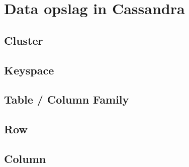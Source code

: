 \chapter{Data opslag in Cassandra}
\label{ch:cassandra_data}



\section{Cluster}
\section{Keyspace}
\section{Table / Column Family}
\section{Row}
\section{Column}